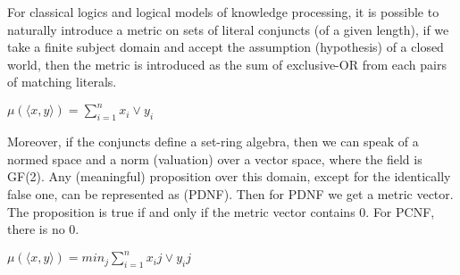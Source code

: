 \documentclass{article}
\begin{document}
\begin{multicols}{2}
\hspace{0.27cm}For classical logics and logical models of knowledge
processing, it is possible to naturally introduce a metric
on sets of literal conjuncts (of a given length), if we take
a finite subject domain and accept the assumption (hypothesis) of a closed world, then the metric is introduced
as the sum of exclusive-OR from each pairs of matching
literals.
\vspace{10pt}

\centerline{$\mu(⟨x, y⟩) = \sum\limits_{i=1}^{n} x_i \vee y_i$}

\vspace{10pt}
Moreover, if the conjuncts define a set-ring algebra, then
we can speak of a normed space and a norm (valuation)
over a vector space, where the field is GF(2). Any
(meaningful) proposition over this domain, except for
the identically false one, can be represented as (PDNF).
Then for PDNF we get a metric vector. The proposition
is true if and only if the metric vector contains 0. For
PCNF, there is no 0.

\vspace{10pt}

\centerline{$\mu(⟨x, y⟩) = min_j\sum\limits_{i=1}^{n} x_ij \vee y_ij$}

\vspace{10pt}


\end{multicols}
\end{document}
